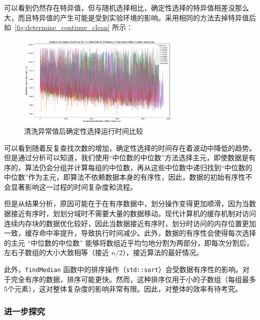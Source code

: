 可以看到仍然存在特异值，但与随机选择相比，确定性选择的特异值相差没那么大，而且特异值的产生可能是受到实验环境的影响。采用相同的方法去掉特异值后如~\autoref{fig:determine_continue_clean} 所示：
\begin{figure}[htbp]
    \centering
    \includegraphics[width=0.7\textwidth]{../figure/determine_continue_clean.png}
    \caption{清洗异常值后确定性选择运行时间比较}
    \label{fig:determine_continue_clean}
\end{figure}

可以看到随着反复查找次数的增加，确定性选择的时间存在着波动中降低的趋势。但是通过分析可以知道，我们使用``中位数的中位数''方法选择主元，即使数据是有序的，算法仍会分组并计算每组的中位数，再从这些中位数中递归找到``中位数的中位数''作为主元，即算法不依赖数据本身的有序性，因此，数据的初始有序性不会显著影响这一过程的时间复杂度和流程。

但是从结果分析，原因可能在于在有序数据中，划分操作变得更加顺滑，因为当数据接近有序时，划划分域时不需要大量的数据移动。现代计算机的缓存机制对访问连续内存块的数据优化较好，因此当数据接近有序时，划分时访问的内存位置更加一致，缓存命中率提升，导致执行时间减少。此外，数据的有序性会使得每次选择的主元 ``中位数的中位数'' 能够将数组近乎均匀地分割为两部分，即每次分割后，左右子数组的大小大致相等（接近 $n/2$），接近算法的最好情况。

此外，\texttt{findMedian} 函数中的排序操作（\texttt{std::sort}）会受数据有序性的影响。对于完全有序的数据，排序可能更快。然而，这种排序仅用于小的子数组（每组最多5个元素），这对整体复杂度的影响非常有限。因此，对整体的效率有待考究。

\subsubsection{进一步探究}

